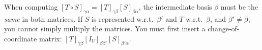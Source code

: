 \begin{commonmistake}[title={Common Mistake: forgetting the intermediate basis in composition}]
When computing $[T\circ S]_{\gamma\alpha}=[T]_{\gamma\beta}[S]_{\beta\alpha}$, the intermediate basis $\beta$ must be the \emph{same} in both matrices.
If $S$ is represented w.r.t.\ $\beta'$ and $T$ w.r.t.\ $\beta$, and $\beta'\neq\beta$, you cannot simply multiply the matrices.
You must first insert a change-of-coordinate matrix: $[T]_{\gamma\beta}[I_V]_{\beta\beta'}[S]_{\beta'\alpha}$.
\end{commonmistake}

